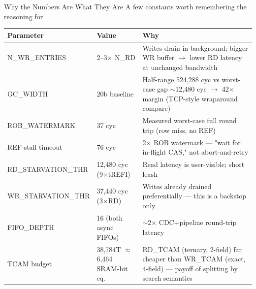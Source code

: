 \documentclass[aspectratio=169,10pt]{beamer}
\begin{document}
\begin{frame}{Why the Numbers Are What They Are}
              {A few constants worth remembering the reasoning for}
  \begin{center}
  \scriptsize
  \renewcommand{\arraystretch}{1.35}
  \begin{tabular}{p{3.6cm}p{2.4cm}p{7.2cm}}
    \toprule
    \textbf{\color{Blue}Parameter} & \textbf{\color{Blue}Value} & \textbf{\color{Blue}Why} \\
    \midrule
    N\_WR\_ENTRIES & 2--3$\times$ N\_RD & Writes drain in background; bigger WR buffer
      $\to$ lower RD latency at unchanged bandwidth \\
    GC\_WIDTH & 20b baseline & Half-range 524{,}288 cyc vs worst-case gap $\sim$12{,}480
      cyc $\to$ 42$\times$ margin (TCP-style wraparound compare) \\
    ROB\_WATERMARK & 37 cyc & Measured worst-case full round trip (row miss, no REF) \\
    REF-stall timeout & 76 cyc & 2$\times$ ROB watermark — "wait for in-flight CAS,"
      not abort-and-retry \\
    RD\_STARVATION\_THR & 12{,}480 cyc (9$\times$tREFI) & Read latency is user-visible;
      short leash \\
    WR\_STARVATION\_THR & 37{,}440 cyc (3$\times$RD) & Writes already drained
      preferentially — this is a backstop only \\
    FIFO\_DEPTH & 16 (both async FIFOs) & $\sim$2$\times$ CDC+pipeline round-trip latency \\
    TCAM budget & 38{,}784T $\approx$ 6{,}464 SRAM-bit eq. & RD\_TCAM (ternary,
      2-field) far cheaper than WR\_TCAM (exact, 4-field) — payoff of splitting by
      search semantics \\
    \bottomrule
  \end{tabular}
  \end{center}
\end{frame}
\end{document}

